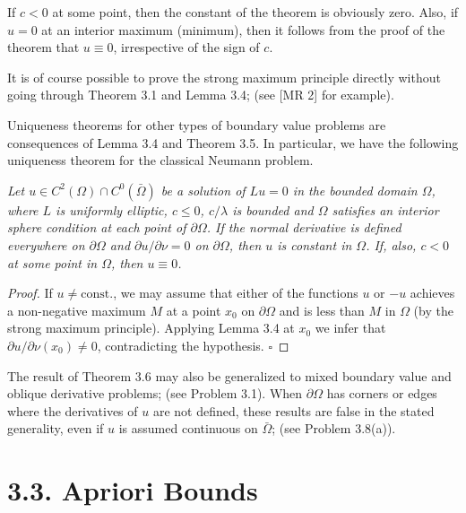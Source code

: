 If $c<0$ at some point, then the constant of the theorem is obviously zero. Also, if $u=0$ at an interior maximum (minimum), then it follows from the proof of the theorem that $u\equiv 0$, irrespective of the sign of $c$.

It is of course possible to prove the strong maximum principle directly without going through Theorem 3.1 and Lemma 3.4; (see [MR 2] for example).

Uniqueness theorems for other types of boundary value problems are consequences of Lemma 3.4 and Theorem 3.5. In particular, we have the following uniqueness theorem for the classical Neumann problem.

\begin{theorem}\label{gt-ch3-neumann}
\emph{Let $u\in C^2(\Omega)\cap C^0(\bar{\Omega})$ be a solution of $Lu=0$ in the bounded domain $\Omega$, where $L$ is uniformly elliptic, $c\le 0$, $c/\lambda$ is bounded and $\Omega$ satisfies an interior sphere condition at each point of $\partial\Omega$. If the normal derivative is defined everywhere on $\partial\Omega$ and $\partial u/\partial\nu=0$ on $\partial\Omega$, then $u$ is constant in $\Omega$. If, also, $c<0$ at some point in $\Omega$, then $u\equiv 0$.}
\end{theorem}

\begin{proof}
If $u\ne \mathrm{const.}$, we may assume that either of the functions $u$ or $-u$ achieves a non-negative maximum $M$ at a point $x_0$ on $\partial\Omega$ and is less than $M$ in $\Omega$ (by the strong maximum principle). Applying Lemma 3.4 at $x_0$ we infer that $\partial u/\partial\nu(x_0)\ne 0$, contradicting the hypothesis. $\square$
\end{proof}

The result of Theorem 3.6 may also be generalized to mixed boundary value and oblique derivative problems; (see Problem 3.1). When $\partial\Omega$ has corners or edges where the derivatives of $u$ are not defined, these results are false in the stated generality, even if $u$ is assumed continuous on $\bar{\Omega}$; (see Problem 3.8(a)).


\section*{3.3. Apriori Bounds}

